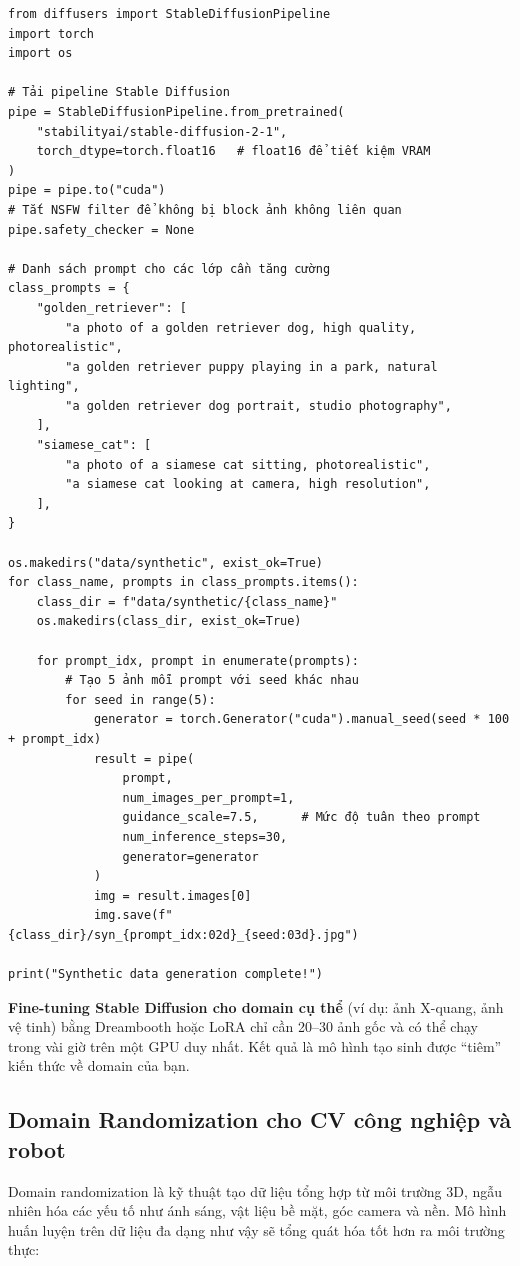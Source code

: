 \begin{verbatim}
from diffusers import StableDiffusionPipeline
import torch
import os

# Tải pipeline Stable Diffusion
pipe = StableDiffusionPipeline.from_pretrained(
    "stabilityai/stable-diffusion-2-1",
    torch_dtype=torch.float16   # float16 để tiết kiệm VRAM
)
pipe = pipe.to("cuda")
# Tắt NSFW filter để không bị block ảnh không liên quan
pipe.safety_checker = None

# Danh sách prompt cho các lớp cần tăng cường
class_prompts = {
    "golden_retriever": [
        "a photo of a golden retriever dog, high quality, photorealistic",
        "a golden retriever puppy playing in a park, natural lighting",
        "a golden retriever dog portrait, studio photography",
    ],
    "siamese_cat": [
        "a photo of a siamese cat sitting, photorealistic",
        "a siamese cat looking at camera, high resolution",
    ],
}

os.makedirs("data/synthetic", exist_ok=True)
for class_name, prompts in class_prompts.items():
    class_dir = f"data/synthetic/{class_name}"
    os.makedirs(class_dir, exist_ok=True)

    for prompt_idx, prompt in enumerate(prompts):
        # Tạo 5 ảnh mỗi prompt với seed khác nhau
        for seed in range(5):
            generator = torch.Generator("cuda").manual_seed(seed * 100 + prompt_idx)
            result = pipe(
                prompt,
                num_images_per_prompt=1,
                guidance_scale=7.5,      # Mức độ tuân theo prompt
                num_inference_steps=30,
                generator=generator
            )
            img = result.images[0]
            img.save(f"{class_dir}/syn_{prompt_idx:02d}_{seed:03d}.jpg")

print("Synthetic data generation complete!")
\end{verbatim}

\textbf{Fine-tuning Stable Diffusion cho domain cụ thể} (ví dụ: ảnh X-quang, ảnh vệ tinh) bằng Dreambooth hoặc LoRA chỉ cần 20--30 ảnh gốc và có thể chạy trong vài giờ trên một GPU duy nhất. Kết quả là mô hình tạo sinh được ``tiêm'' kiến thức về domain của bạn.

\subsection*{Domain Randomization cho CV công nghiệp và robot}

Domain randomization là kỹ thuật tạo dữ liệu tổng hợp từ môi trường 3D, ngẫu nhiên hóa các yếu tố như ánh sáng, vật liệu bề mặt, góc camera và nền. Mô hình huấn luyện trên dữ liệu đa dạng như vậy sẽ tổng quát hóa tốt hơn ra môi trường thực:


